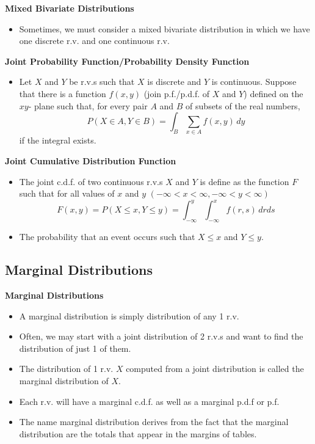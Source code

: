 \documentclass[11pt]{article}
\begin{document}
\textbf{Mixed Bivariate Distributions}\
\begin{itemize}
    \item Sometimes, we must consider a mixed bivariate distribution in which we have one 
    discrete r.v. and one continuous r.v.
\end{itemize}

\textbf{Joint Probability Function/Probability Density Function}
\begin{itemize}
    \item Let $X$ and $Y$ be r.v.s such that $X$ is discrete and $Y$ is continuous. Suppose 
    that there is a function $f(x,y)$ (join p.f./p.d.f. of $X$ and $Y$) defined on the $xy$-
    plane such that, for every pair $A$ and $B$ of subsets of the real numbers,
    \[P(X \in A, Y \in B) = \int_B \sum_{x \in A} f(x,y) \,dy\]
    if the integral exists.
\end{itemize}

\textbf{Joint Cumulative Distribution Function}
\begin{itemize}
    \item The joint c.d.f. of two continuous r.v.s $X$ and $Y$ is define as the function $F$ such 
    that for all values of $x$ and $y$ $(-\infty < x < \infty, -\infty < y < \infty)$ 
    \[F(x,y)=P(X \le x, Y \le y) = \int_{-\infty}^{y} \int_{-\infty}^{x} f(r,s) \,drds\]
    \item The probability that an event occurs such that $X \le x$ and $Y \le y$.
\end{itemize}

\subsection{Marginal Distributions}

\textbf{Marginal Distributions}
\begin{itemize}
    \item A marginal distribution is simply distribution of any 1 r.v.
    \item Often, we may start with a joint distribution of 2 r.v.s and want to find the 
    distribution of just 1 of them.
    \item The distribution of 1 r.v. $X$ computed from a joint distribution is called the 
    marginal distribution of $X$. 
    \item Each r.v. will have a marginal c.d.f. as well as a marginal p.d.f or p.f.
    \item The name marginal distribution derives from the fact that the marginal distribution
    are the totals that appear in the margins of tables. 
\end{itemize}
\end{document}
